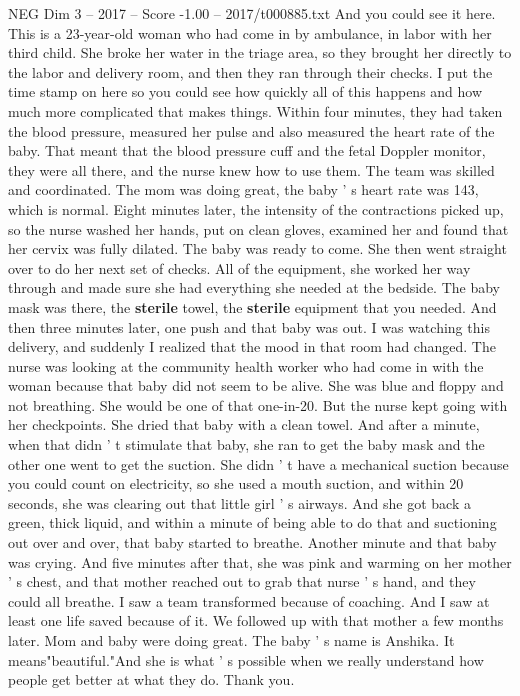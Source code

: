 \begin{textsample}{NEG Dim 3 – 2017 – Score -1.00 – 2017/t000885.txt}
And you could see it here.
This is a 23-year-old woman who had come in by ambulance, in labor with her third child.
She broke her water in the triage area, so they brought her directly to the labor and delivery room, and then they ran through their checks.
I put the time stamp on here so you could see how quickly all of this happens and how much more complicated that makes things.
Within four minutes, they had taken the blood pressure, measured her pulse and also measured the heart rate of the baby.
That meant that the blood pressure cuff and the fetal Doppler monitor, they were all there, and the nurse knew how to use them.
The team was skilled and coordinated.
The mom was doing great, the baby ' s heart rate was 143, which is normal.
Eight minutes later, the intensity of the contractions picked up, so the nurse washed her hands, put on clean gloves, examined her and found that her cervix was fully dilated.
The baby was ready to come.
She then went straight over to do her next set of checks.
All of the equipment, she worked her way through and made sure she had everything she needed at the bedside.
The baby mask was there, the \textbf{sterile} towel, the \textbf{sterile} equipment that you needed.
And then three minutes later, one push and that baby was out.
I was watching this delivery, and suddenly I realized that the mood in that room had changed.
The nurse was looking at the community health worker who had come in with the woman because that baby did not seem to be alive.
She was blue and floppy and not breathing.
She would be one of that one-in-20.
But the nurse kept going with her checkpoints.
She dried that baby with a clean towel.
And after a minute, when that didn ' t stimulate that baby, she ran to get the baby mask and the other one went to get the suction.
She didn ' t have a mechanical suction because you could count on electricity, so she used a mouth suction, and within 20 seconds, she was clearing out that little girl ' s airways.
And she got back a green, thick liquid, and within a minute of being able to do that and suctioning out over and over, that baby started to breathe.
Another minute and that baby was crying.
And five minutes after that, she was pink and warming on her mother ' s chest, and that mother reached out to grab that nurse ' s hand, and they could all breathe.
I saw a team transformed because of coaching.
And I saw at least one life saved because of it.
We followed up with that mother a few months later.
Mom and baby were doing great.
The baby ' s name is Anshika.
It means"beautiful."And she is what ' s possible when we really understand how people get better at what they do.
Thank you.

\end{textsample}

